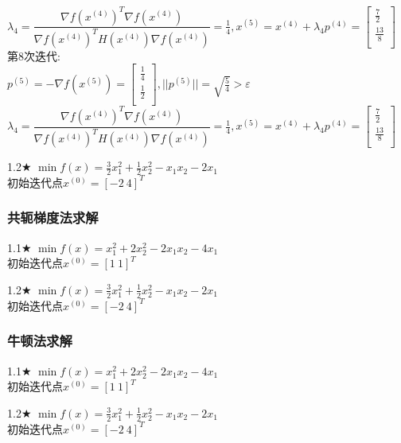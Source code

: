 \begin{solution}
$\lambda_4=\dfrac{\nabla f(x^{(4)})^T\nabla f(x^{(4)})}{\nabla f(x^{(4)})^TH(x^{(4)})\nabla f(x^{(4)})}=\frac{1}{4},x^{(5)}=x^{(4)}+\lambda_4p^{(4)}=\begin{bmatrix} \frac{7}{2}\\\frac{13}{8}\\\end{bmatrix}$\\
第8次迭代:\\
$p^{(5)}=-\nabla f(x^{(5)})=\begin{bmatrix} \frac{1}{4}\\\frac{1}{2}\\\end{bmatrix},||p^{(5)}||=\sqrt{\frac{5}{4}}>\varepsilon$\\
$\lambda_4=\dfrac{\nabla f(x^{(4)})^T\nabla f(x^{(4)})}{\nabla f(x^{(4)})^TH(x^{(4)})\nabla f(x^{(4)})}=\frac{1}{4},x^{(5)}=x^{(4)}+\lambda_4p^{(4)}=\begin{bmatrix} \frac{7}{2}\\\frac{13}{8}\\\end{bmatrix}$\\
\end{solution}

\begin{problem}{1.2$\bigstar$}
    $\min f(x)=\frac{3}{2}x_1^2+\frac{1}{2}x_2^2-x_1x_2-2x_1$\\
初始迭代点${x^{(0)}}=[-2\ 4]^T$
\end{problem}
\begin{solution}


\end{solution}

\subsubsection{共轭梯度法求解}

\begin{problem}{1.1$\bigstar$}
    $\min f(x)=x_1^2+2x_2^2-2x_1x_2-4x_1$\\
    初始迭代点${x^{(0)}}=[1\ 1]^T$
\end{problem}

\begin{problem}{1.2$\bigstar$}
    $\min f(x)=\frac{3}{2}x_1^2+\frac{1}{2}x_2^2-x_1x_2-2x_1$\\
    初始迭代点${x^{(0)}}=[-2\ 4]^T$
\end{problem}

\subsubsection{牛顿法求解}

\begin{problem}{1.1$\bigstar$}
    $\min f(x)=x_1^2+2x_2^2-2x_1x_2-4x_1$\\
    初始迭代点${x^{(0)}}=[1\ 1]^T$
\end{problem}

\begin{problem}{1.2$\bigstar$}
    $\min f(x)=\frac{3}{2}x_1^2+\frac{1}{2}x_2^2-x_1x_2-2x_1$\\
    初始迭代点${x^{(0)}}=[-2\ 4]^T$
\end{problem}